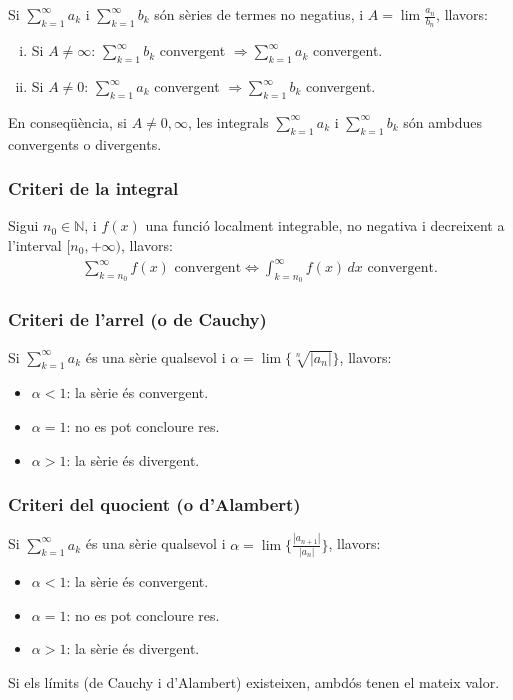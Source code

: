Si $\sum_{k=1}^{\infty} a_{k}$ i $\sum_{k=1}^{\infty} b_{k}$ són sèries de termes no negatius, i $A = \lim \frac{a_{n}}{b_{n}}$, llavors:
\begin{enumerate}[i)]
    \item Si $A \neq \infty$: $\sum\limits_{k=1}^{\infty} b_{k}$ convergent $\Rightarrow \sum\limits_{k=1}^{\infty} a_{k}$ convergent.
    \item Si $A \neq 0$: $\sum\limits_{k=1}^{\infty} a_{k}$ convergent $\Rightarrow \sum\limits_{k=1}^{\infty} b_{k}$ convergent.
\end{enumerate}

En conseqüència, si $A \neq 0, \infty$, les integrals $\sum\limits_{k=1}^{\infty} a_{k}$ i $\sum\limits_{k=1}^{\infty} b_{k}$ són ambdues convergents o divergents.

\subsubsection*{Criteri de la integral}
Sigui $n_{0} \in \mathbb{N}$, i $f(x)$ una funció localment integrable, no negativa i decreixent a l'interval $[n_{0}, + \infty)$, llavors:
\begin{align}
    \sum\limits_{k=n_{0}}^{\infty} f(x) \text{ convergent} \Leftrightarrow \int_{k=n_{0}}^{\infty} f(x) \, dx \text{ convergent}.
\end{align}

\subsubsection*{Criteri de l'arrel (o de Cauchy)}
Si $\sum_{k=1}^{\infty} a_{k}$ és una sèrie qualsevol i $\alpha = \lim \{\sqrt[n]{|a_{n}|}\}$, llavors:
\begin{itemize}
    \item $\alpha < 1$: la sèrie és convergent.
    \item $\alpha = 1$: no es pot concloure res.
    \item $\alpha > 1$: la sèrie és divergent.
\end{itemize}

\subsubsection*{Criteri del quocient (o d'Alambert)}
Si $\sum_{k=1}^{\infty} a_{k}$ és una sèrie qualsevol i $\alpha = \lim \{ \frac{|a_{n+1}|}{|a_{n}|} \}$, llavors:
\begin{itemize}
    \item $\alpha < 1$: la sèrie és convergent.
    \item $\alpha = 1$: no es pot concloure res.
    \item $\alpha > 1$: la sèrie és divergent.
\end{itemize}
Si els límits (de Cauchy i d'Alambert) existeixen, ambdós tenen el mateix valor.
